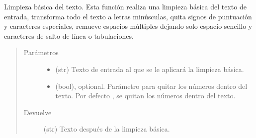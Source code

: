 \documentclass[letterpaper,10pt,openany,spanish]{sphinxmanual}
\begin{document}
\begin{fulllineitems}
\label{\detokenize{funciones/limpieza:limpieza.limpieza_basica}}
Limpieza básica del texto. Esta función realiza una limpieza básica del texto de entrada,     transforma todo el texto a letras minúsculas, quita signos de puntuación y caracteres     especiales, remueve espacios múltiples dejando solo espacio sencillo y caracteres     de salto de línea o tabulaciones.
\begin{quote}\begin{description}
\item[{Parámetros}] \leavevmode\begin{itemize}
\item {} 
 \textendash{} (str) Texto de entrada al que se le aplicará la limpieza básica.

\item {} 
 \textendash{} (bool), optional. Parámetro para quitar los números dentro del         texto. Por defecto , se quitan los números dentro del texto.

\end{itemize}

\item[{Devuelve}] \leavevmode
(str) Texto después de la limpieza básica.

\end{description}\end{quote}

\end{fulllineitems}

\end{document}

